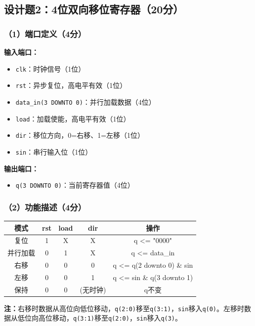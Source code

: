 \subsection{设计题2：4位双向移位寄存器（20分）}

\subsubsection{（1）端口定义（4分）}

\textbf{输入端口：}
\begin{itemize}
\item \texttt{clk}：时钟信号（1位）
\item \texttt{rst}：异步复位，高电平有效（1位）
\item \texttt{data\_in(3 DOWNTO 0)}：并行加载数据（4位）
\item \texttt{load}：加载使能，高电平有效（1位）
\item \texttt{dir}：移位方向，0=右移、1=左移（1位）
\item \texttt{sin}：串行输入位（1位）
\end{itemize}

\textbf{输出端口：}
\begin{itemize}
\item \texttt{q(3 DOWNTO 0)}：当前寄存器值（4位）
\end{itemize}

\subsubsection{（2）功能描述（4分）}

\begin{center}
\begin{tabular}{|c|c|c|c|c|}
\hline
\textbf{模式} & \textbf{rst} & \textbf{load} & \textbf{dir} & \textbf{操作} \\
\hline
复位 & 1 & X & X & q <= "0000" \\
并行加载 & 0 & 1 & X & q <= data\_in \\
右移 & 0 & 0 & 0 & q <= q(2 downto 0) \& sin \\
左移 & 0 & 0 & 1 & q <= sin \& q(3 downto 1) \\
保持 & 0 & 0 & (无时钟) & q不变 \\
\hline
\end{tabular}
\end{center}

\textbf{注：}右移时数据从高位向低位移动，\texttt{q(2:0)}移至\texttt{q(3:1)}，\texttt{sin}移入\texttt{q(0)}。左移时数据从低位向高位移动，\texttt{q(3:1)}移至\texttt{q(2:0)}，\texttt{sin}移入\texttt{q(3)}。

